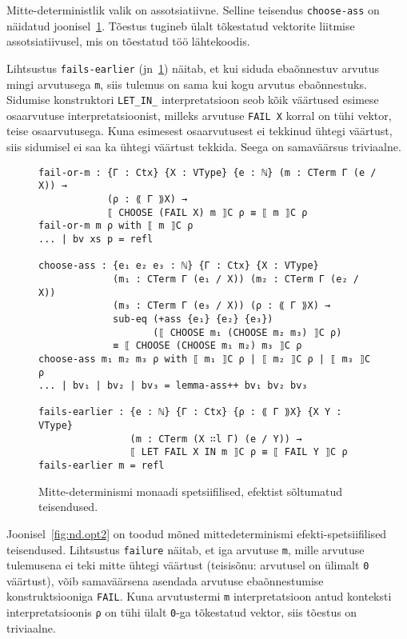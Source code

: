 \documentclass[a4paper,12pt]{article}
\begin{document}
Mitte-deterministlik valik on assotsiatiivne. Selline teisendus {\tt choose-ass} on näidatud joonisel~\ref{fig:nd.opt1}. Tõestus tugineb ülalt tõkestatud vektorite liitmise assotsiatiivusel, mis on tõestatud töö lähtekoodis.

Lihtsustus {\tt fails-earlier} (jn~\ref{fig:nd.opt1}) näitab, et kui siduda ebaõnnestuv arvutus mingi arvutusega {\tt m}, siis tulemus on sama kui kogu arvutus ebaõnnestuks. Sidumise konstruktori {\tt LET_IN_} interpretatsioon seob kõik väärtused esimese osaarvutuse interpretatsioonist, milleks arvutuse {\tt FAIL X} korral on tühi vektor, teise osaarvutusega. Kuna esimesest osaarvutusest ei tekkinud ühtegi väärtust, siis sidumisel ei saa ka ühtegi väärtust tekkida. Seega on samaväärsus triviaalne.
\begin{figure}
  \begin{BVerbatim}
fail-or-m : {Γ : Ctx} {X : VType} {e : ℕ} (m : CTerm Γ (e / X)) →
            (ρ : ⟪ Γ ⟫X) → 
            ⟦ CHOOSE (FAIL X) m ⟧C ρ ≡ ⟦ m ⟧C ρ
fail-or-m m ρ with ⟦ m ⟧C ρ
... | bv xs p = refl

choose-ass : {e₁ e₂ e₃ : ℕ} {Γ : Ctx} {X : VType}
             (m₁ : CTerm Γ (e₁ / X)) (m₂ : CTerm Γ (e₂ / X))
             (m₃ : CTerm Γ (e₃ / X)) (ρ : ⟪ Γ ⟫X) →
             sub-eq (+ass {e₁} {e₂} {e₃})
                    (⟦ CHOOSE m₁ (CHOOSE m₂ m₃) ⟧C ρ)
             ≡ ⟦ CHOOSE (CHOOSE m₁ m₂) m₃ ⟧C ρ
choose-ass m₁ m₂ m₃ ρ with ⟦ m₁ ⟧C ρ | ⟦ m₂ ⟧C ρ | ⟦ m₃ ⟧C ρ
... | bv₁ | bv₂ | bv₃ = lemma-ass++ bv₁ bv₂ bv₃

fails-earlier : {e : ℕ} {Γ : Ctx} {ρ : ⟪ Γ ⟫X} {X Y : VType}
                (m : CTerm (X ∷l Γ) (e / Y)) →
                ⟦ LET FAIL X IN m ⟧C ρ ≡ ⟦ FAIL Y ⟧C ρ
fails-earlier m = refl
  \end{BVerbatim}
  \caption{Mitte-determinismi monaadi spetsiifilised, efektist sõltumatud teisendused.}
  \label{fig:nd.opt1}
\end{figure}

Joonisel~\ref{fig:nd.opt2} on toodud mõned mittedeterminismi efekti-spetsiifilised teisendused. Lihtsustus {\tt failure} näitab, et iga arvutuse {\tt m}, mille arvutuse tulemusena ei teki mitte ühtegi väärtust (teisisõnu: arvutusel on ülimalt {\tt 0} väärtust), võib samaväärsena asendada arvutuse ebaõnnestumise konstruktsiooniga {\tt FAIL}. Kuna arvutustermi {\tt m} interpretatsioon antud konteksti interpretatsioonis {\tt ρ} on tühi ülalt {\tt 0}-ga tõkestatud vektor, siis tõestus on triviaalne.
\end{document}
